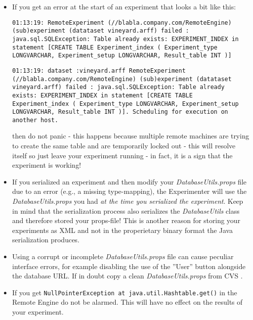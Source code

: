 \documentclass[a4paper]{article}
\begin{document}
\begin{itemize}
   \item If you get an error at the start of an experiment that looks a bit like this: 

    \texttt{01:13:19: RemoteExperiment (//blabla.company.com/RemoteEngine) (sub)experiment (datataset vineyard.arff) failed : \\ java.sql.SQLException: Table already exists: EXPERIMENT\_INDEX in statement [CREATE TABLE Experiment\_index ( Experiment\_type \\ LONGVARCHAR, Experiment\_setup LONGVARCHAR, Result\_table INT )]} 

    \texttt{01:13:19: dataset :vineyard.arff RemoteExperiment \\ (//blabla.company.com/RemoteEngine) (sub)experiment (datataset vineyard.arff) failed : java.sql.SQLException: Table already exists: EXPERIMENT\_INDEX in statement [CREATE TABLE \\ Experiment\_index ( Experiment\_type LONGVARCHAR, Experiment\_setup LONGVARCHAR, Result\_table INT )]. Scheduling for execution on \\ another host.} 

    then do not panic - this happens because multiple remote machines are trying to create the same table and are temporarily locked out - this will resolve itself so just leave your experiment running - in fact, it is a sign that the experiment is working! 

   \item If you serialized an experiment and then modify your \textit{DatabaseUtils.props} file due to an error (e.g., a missing type-mapping), the Experimenter will use the \textit{DatabaseUtils.props} you had \textit{at the time you serialized the experiment}. Keep in mind that the serialization process also serializes the \textit{DatabaseUtils} class and therefore stored your props-file! This is another reason for storing your experiments as XML and not in the properietary binary format the Java serialization produces. 

   \item Using a corrupt or incomplete \textit{DatabaseUtils.props} file can cause peculiar interface errors, for example disabling the use of the ''User'' button alongside the database URL. If in doubt copy a clean \textit{DatabaseUtils.props} from CVS \cite{cvs}. 

   \item If you get \texttt{NullPointerException at java.util.Hashtable.get()} in the Remote Engine do not be alarmed. This will have no effect on the results of your experiment. 
\end{itemize}
    
\end{document}
